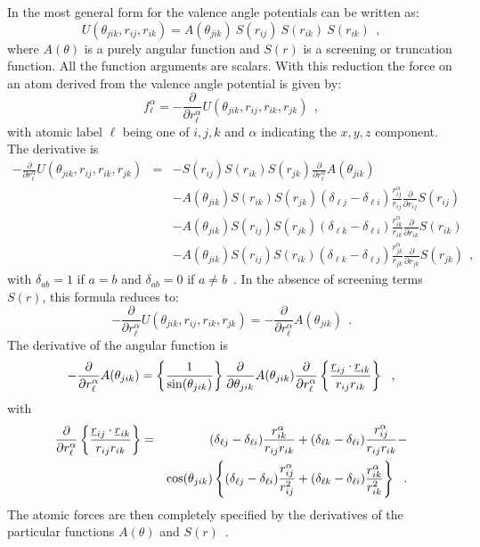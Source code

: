 In \D the most general form for the valence
angle
potentials can be written as:
\begin{equation}
U(\theta_{jik},r_{ij},r_{ik}) = A(\theta_{jik})~S(r_{ij})~S(r_{ik})~S(r_{ik})~~,
\end{equation}
where $A(\theta)$ is a purely angular function and $S(r)$ is a
screening or truncation function.  All the function arguments are
scalars.  With this reduction the force on an atom derived from
the valence angle potential is
given by:
\begin{equation}
f_{\ell}^{\alpha} = -\frac{\partial}{\partial
r_{\ell}^{\alpha}}U(\theta_{jik},r_{ij},r_{ik},r_{jk})~~,
\end{equation}
with atomic label $\ell$ being one of $i,j,k$ and $\alpha$
indicating the $x,y,z$ component.  The derivative is
\begin{eqnarray}
-\frac{\partial}{\partial r_{\ell}^{\alpha}}U(\theta_{jik},r_{ij},r_{ik},r_{jk})&=&
-S(r_{ij})S(r_{ik})S(r_{jk})\frac{\partial}{\partial r_{\ell}^{\alpha}}A(\theta_{jik}) \nonumber \\
& & - A(\theta_{jik})S(r_{ik})S(r_{jk})(\delta_{\ell j}-\delta_{\ell i})
\frac{r_{ij}^{\alpha}}{r_{ij}} \frac{\partial}{\partial r_{ij}}S(r_{ij}) \nonumber \\
& & - A(\theta_{jik})S(r_{ij})S(r_{jk})(\delta_{\ell k}-\delta_{\ell i})
\frac{r_{ik}^{\alpha}}{r_{ik}} \frac{\partial}{\partial r_{ik}}S(r_{ik}) \nonumber \\
& & - A(\theta_{jik})S(r_{ij})S(r_{ik})(\delta_{\ell k}-\delta_{\ell j})
\frac{r_{jk}^{\alpha}}{r_{jk}} \frac{\partial}{\partial r_{jk}}S(r_{jk})~~,
\end{eqnarray}
with $\delta_{ab}=1$ if $a=b$ and $\delta_{ab}=0$ if $a\ne b$~.
In the absence of screening terms $S(r)$, this formula reduces to:
\begin{equation}
-\frac{\partial}{\partial
r_{\ell}^{\alpha}}U(\theta_{jik},r_{ij},r_{ik},r_{jk}) =
-\frac{\partial}{\partial r_{\ell}^{\alpha}}A(\theta_{jik})~~.
\end{equation}
The derivative of the angular function is
\begin{equation}
-\frac{\partial}{\partial r_{\ell}^{\alpha}}A(\theta_{jik}) =
\left\{\frac{1}{\sin(\theta_{jik})}\right\}
\frac{\partial}{\partial \theta_{jik}}A(\theta_{jik})
\frac{\partial}{\partial r_{\ell}^{\alpha}}\left\{
\frac{\mbox{$\underline{r}$}_{ij}\cdot\mbox{$\underline{r}$}_{ik}}{r_{ij}r_{ik}}\right\}~~,
\end{equation}
with
\begin{eqnarray}
\frac{\partial}{\partial r_{\ell}^{\alpha}}\left\{ \frac{\mbox{$\underline{r}$}_{ij}\cdot\mbox{$\underline{r}$}_{ik}}{r_{ij}r_{ik}}\right\}&=&
(\delta_{\ell j}-\delta_{\ell i})\frac{r_{ik}^{\alpha}}{r_{ij}r_{ik}}+ (\delta_{\ell k}-
\delta_{\ell i})\frac{r_{ij}^{\alpha}}{r_{ij}r_{ik}}-\nonumber \\
& & \cos(\theta_{jik}) \left\{(\delta_{\ell j}-\delta_{\ell i})\frac{r_{ij}^{\alpha}}{r_{ij}^{2}}+
(\delta_{\ell k}-\delta_{\ell i})\frac{r_{ik}^{\alpha}}{r_{ik}^{2}}\right\}~~.
\end{eqnarray}
The atomic forces are then completely specified by the derivatives
of the particular functions $A(\theta)$ and $S(r)$~.

